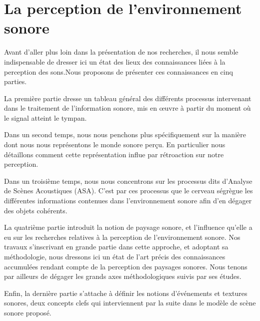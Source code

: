 \chapter{La perception de l'environnement sonore}\label{ch:psycho_ea}
Avant d'aller plus loin dans la présentation de nos recherches, il nous semble indispensable de dresser ici un état des lieux des connaissances liées à la perception des sons.Nous proposons de présenter ces connaissances en cinq parties. 

La première partie dresse un tableau général des différents processus intervenant dans le traitement de l'information sonore, mis en œuvre à partir du moment où le signal atteint le tympan. 

Dans un second temps, nous nous penchons plus spécifiquement sur la manière dont nous nous représentons le monde sonore perçu. En particulier nous détaillons comment cette représentation influe par rétroaction sur notre perception. 

Dans un troisième temps, nous nous concentrons sur les processus dits d'Analyse de Scènes Acoustiques (ASA). C'est par ces processus que le cerveau ségrègue les différentes informations contenues dans l'environnement sonore afin d'en dégager des objets cohérents. 

La quatrième partie introduit la notion de paysage sonore, et l'influence qu'elle a eu sur les recherches relatives à la perception de l'environnement sonore. Nos travaux s'inscrivant en grande partie dans cette approche, et adoptant sa méthodologie, nous dressons ici un état de l'art précis des connaissances accumulées rendant compte de la perception des paysages sonores. Nous tenons par ailleurs de dégager les grands axes méthodologiques suivis par ses études.

Enfin, la dernière partie s'attache à définir les notions d'événements et textures sonores, deux concepts clefs qui interviennent par la suite dans le modèle de scène sonore proposé.


